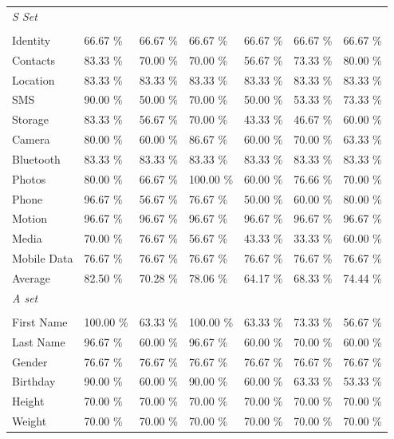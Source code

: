 \begin{appendices}
\begin{table}
\begin{tabular}{P{2.5cm}P{1.7cm}P{1.6cm}P{1.5cm}P{1.5cm}P{1.5cm}P{1.9cm}}
\textit{S Set}\\
\\
Identity & 66.67 \% & 66.67 \% &66.67 \%  & 66.67 \% &  66.67 \% & 66.67 \%\\
Contacts & 83.33 \% & 70.00 \% &70.00 \% & 56.67 \% & 73.33 \% & 80.00 \%\\
Location & 83.33 \% & 83.33 \% &83.33 \% &  83.33 \% & 83.33 \% & 83.33 \%\\
SMS  & 90.00 \% & 50.00 \% & 70.00 \% & 50.00 \% & 53.33 \% & 73.33 \%\\
Storage & 83.33 \% & 56.67 \% &70.00 \%  & 43.33 \% & 46.67 \%& 60.00 \%\\
Camera  & 80.00 \% & 60.00 \% &86.67 \%  & 60.00 \% & 70.00 \% & 63.33 \%\\
Bluetooth & 83.33 \% & 83.33 \% & 83.33 \%  & 83.33 \% & 83.33 \% & 83.33 \%\\
Photos & 80.00 \% & 66.67 \%  & 100.00 \%  & 60.00 \%  & 76.66 \% & 70.00 \%\\
Phone & 96.67 \% & 56.67 \% & 76.67 \% & 50.00 \% & 60.00 \% & 80.00 \%\\
Motion & 96.67 \% & 96.67 \% & 96.67 \% & 96.67 \% & 96.67 \% & 96.67 \%\\
Media & 70.00 \% & 76.67 \% & 56.67 \% & 43.33 \% & 33.33 \% & 60.00 \%\\
Mobile Data & 76.67 \% & 76.67 \% &76.67 \% & 76.67 \% & 76.67 \% & 76.67 \%\\

\cmidrule(r){2-7}
Average & 82.50 \%& 70.28 \% & 78.06 \% & 64.17 \% & 68.33 \% & 74.44 \%\\
\cmidrule(r){1-7}
\textit{A set}\\
\\

First Name &100.00 \% & 63.33 \% &100.00 \%& 63.33 \%& 73.33 \% & 56.67 \%\\
Last Name &96.67 \% &60.00 \% &96.67 \%& 60.00 \%& 70.00 \% & 60.00 \%\\
Gender &76.67 \% &76.67 \% & 76.67 \% & 76.67 \%& 76.67 \% & 76.67 \%\\
Birthday &90.00 \%&60.00 \% &90.00 \%  & 60.00 \% & 63.33 \%& 53.33 \%\\
Height &70.00 \% &70.00 \% & 70.00 \% & 70.00 \% & 70.00 \%& 70.00 \%\\
Weight &70.00 \% &70.00 \% & 70.00 \% & 70.00 \%& 70.00 \%& 70.00 \%\\


\end{tabular}
\end{table}
\end{appendices}
